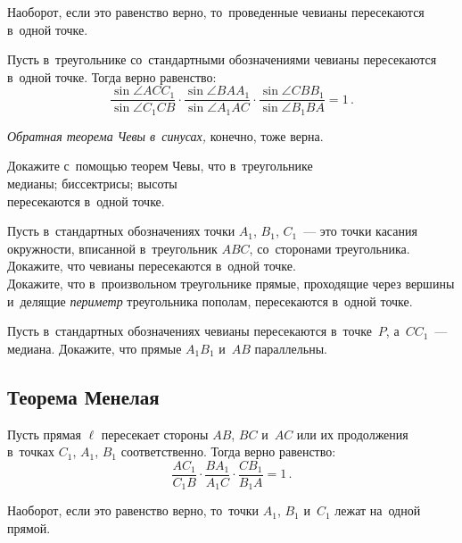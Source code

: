 Наоборот, если это равенство верно, то~проведенные чевианы
пересекаются в~одной точке.

Пусть в~треугольнике со~стандартными обозначениями чевианы пересекаются
в~одной точке.
Тогда верно равенство:
\[
    \frac{\sin \angle A C C_1}{\sin \angle C_1 C B} \cdot
    \frac{\sin \angle B A A_1}{\sin \angle A_1 A C} \cdot
    \frac{\sin \angle C B B_1}{\sin \angle B_1 B A}
=
    1
\, . \]

\emph{Обратная теорема Чевы в~синусах,} конечно, тоже верна.

\begin{problems}

\item
Докажите с~помощью теорем Чевы, что в~треугольнике
\\
\subproblem медианы;
\quad
\subproblem биссектрисы;
\quad
\subproblem высоты
\\
пересекаются в~одной точке.

\item
\subproblem
Пусть в~стандартных обозначениях
точки $A_1$, $B_1$, $C_1$~--- это точки касания окружности, вписанной
в~треугольник $ABC$, со~сторонами треугольника.
Докажите, что чевианы пересекаются в~одной точке.
\\
\subproblem
Докажите, что в~произвольном треугольнике прямые, проходящие через вершины
и~делящие \emph{периметр} треугольника пополам, пересекаются в~одной точке.

\item
Пусть в~стандартных обозначениях чевианы пересекаются в~точке~$P$,
а~$C C_1$~--- медиана.
Докажите, что прямые $A_1 B_1$ и~$AB$ параллельны.

\end{problems}


\subsection*{Теорема Менелая}

Пусть прямая $\ell$ пересекает стороны $AB$, $BC$ и~$AC$ или их продолжения
в~точках $C_1$, $A_1$, $B_1$
соответственно.
Тогда верно равенство:
\[
    \frac{A C_1}{C_1 B} \cdot \frac{B A_1}{A_1 C} \cdot \frac{C B_1}{B_1 A}
=
    1
\, . \]

Наоборот, если это равенство верно, то~точки $A_1$, $B_1$ и~$C_1$ лежат
на~одной прямой.

